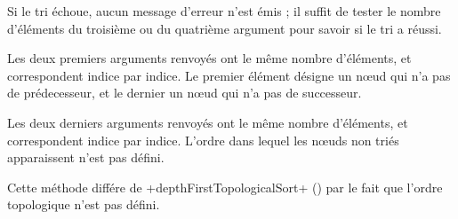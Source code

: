Si le tri échoue, aucun message d'erreur n'est émis ; il suffit de tester le nombre d'éléments du troisième ou du quatrième argument pour savoir si le tri a réussi.

Les deux premiers arguments renvoyés ont le même nombre d'éléments, et correspondent indice par indice. Le premier élément désigne un nœud qui n'a pas de prédecesseur, et le dernier un nœud qui n'a pas de successeur.


Les deux derniers arguments renvoyés ont le même nombre d'éléments, et correspondent indice par indice. L'ordre dans lequel les nœuds non triés apparaissent n'est pas défini.

Cette méthode différe de \ggsq+depthFirstTopologicalSort+ () par le fait que  l'ordre topologique n'est pas défini.
